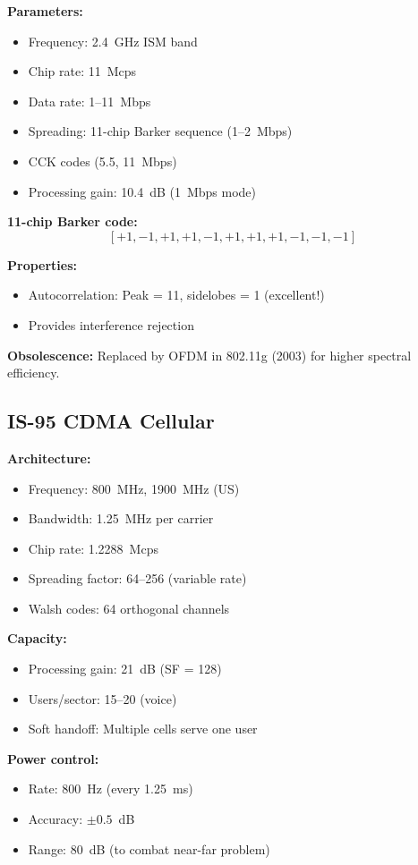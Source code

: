 \textbf{Parameters:}
\begin{itemize}
\item Frequency: 2.4~GHz ISM band
\item Chip rate: 11~Mcps
\item Data rate: 1--11~Mbps
\item Spreading: 11-chip Barker sequence (1--2~Mbps)
\item CCK codes (5.5, 11~Mbps)
\item Processing gain: 10.4~dB (1~Mbps mode)
\end{itemize}

\textbf{11-chip Barker code:}
$$[+1, -1, +1, +1, -1, +1, +1, +1, -1, -1, -1]$$

\textbf{Properties:}
\begin{itemize}
\item Autocorrelation: Peak = 11, sidelobes = 1 (excellent!)
\item Provides interference rejection
\end{itemize}

\textbf{Obsolescence:} Replaced by OFDM in 802.11g (2003) for higher spectral efficiency.

\subsection{IS-95 CDMA Cellular}

\textbf{Architecture:}
\begin{itemize}
\item Frequency: 800~MHz, 1900~MHz (US)
\item Bandwidth: 1.25~MHz per carrier
\item Chip rate: 1.2288~Mcps
\item Spreading factor: 64--256 (variable rate)
\item Walsh codes: 64 orthogonal channels
\end{itemize}

\textbf{Capacity:}
\begin{itemize}
\item Processing gain: 21~dB (SF = 128)
\item Users/sector: 15--20 (voice)
\item Soft handoff: Multiple cells serve one user
\end{itemize}

\textbf{Power control:}
\begin{itemize}
\item Rate: 800~Hz (every 1.25~ms)
\item Accuracy: $\pm 0.5$~dB
\item Range: 80~dB (to combat near-far problem)
\end{itemize}

